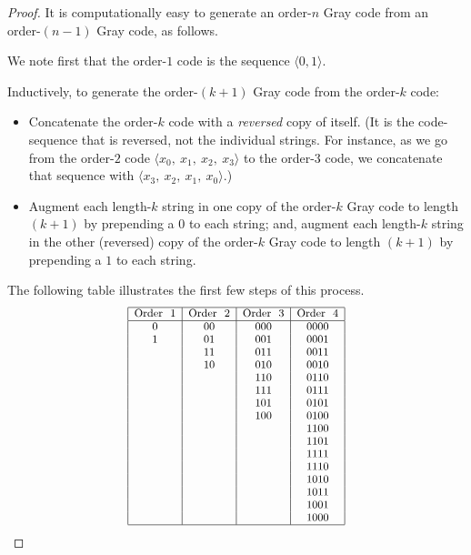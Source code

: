 \begin{proof}
\noindent
It is computationally easy to generate an order-$n$ Gray code from an
order-$(n-1)$ Gray code, as follows.

We note first that the order-$1$ code is the sequence $\langle 0, 1
\rangle$.

Inductively, to generate the order-$(k+1)$ Gray code from the
order-$k$ code:
\begin{itemize}
\item
Concatenate the order-$k$ code with a {\em reversed} copy of itself.
(It is the code-sequence that is reversed, not the individual strings.
For instance, as we go from the order-$2$ code $\langle x_0, \ x_1,
\ x_2, \ x_3 \rangle$ to the order-$3$ code, we concatenate that
sequence with $\langle x_3, \ x_2, \ x_1, \ x_0 \rangle$.)
\item
Augment each length-$k$ string in one copy of the order-$k$ Gray code
to length $(k+1)$ by prepending a $0$ to each string; and, augment
each length-$k$ string in the other (reversed) copy of the order-$k$
Gray code to length $(k+1)$ by prepending a $1$ to each string.
\end{itemize}
The following table illustrates the first few steps of this process.
\begin{equation}
\label{eq:gray-code}
 {\small
\begin{array}{|c|c|c|c|}
\hline
\mbox{Order } \ 1
  & \mbox{Order } \ 2
  & \mbox{Order } \ 3
  & \mbox{Order } \ 4 \\
\hline
0   & 00   & 000  &  0000 \\ 
1   & 01   & 001  &  0001 \\
    & 11   & 011  &  0011 \\
    & 10   & 010  &  0010 \\
    &      & 110  &  0110 \\
    &      & 111  &  0111 \\
    &      & 101  &  0101 \\
    &      & 100  &  0100 \\
    &      &      &  1100 \\  
    &      &      &  1101 \\  
    &      &      &  1111 \\  
    &      &      &  1110 \\  
    &      &      &  1010 \\  
    &      &      &  1011 \\  
    &      &      &  1001 \\  
    &      &      &  1000 \\  
\hline
\end{array} }
\end{equation}


\end{proof}
